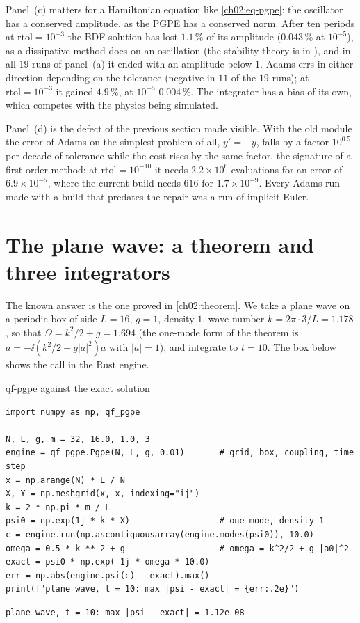 Panel~(c) matters for a Hamiltonian equation like \cref{ch02:eq-pgpe}: the oscillator has a conserved amplitude, as the PGPE has a conserved norm. After ten periods at $\mathrm{rtol}=10^{-3}$ the BDF solution has lost $1.1\,\%$ of its amplitude ($0.043\,\%$ at $10^{-5}$), as a dissipative method does on an oscillation (the stability theory is in
\cite{HairerWanner1996}), and in all $19$ runs of panel~(a) it ended with an amplitude below $1$. Adams errs in either direction depending on the tolerance (negative in $11$ of the $19$ runs); at $\mathrm{rtol}=10^{-3}$ it gained $4.9\,\%$, at $10^{-5}$ $0.004\,\%$. The integrator
has a bias of its own, which competes with the physics being simulated.

Panel~(d) is the defect of the previous section made visible. With the old module the error of Adams on the simplest problem of all, $y'=-y$, falls by a factor $10^{0.5}$ per decade of tolerance while the cost rises by the same
factor, the signature of a first-order method: at $\mathrm{rtol}=10^{-10}$ it needs $2.2\times10^{6}$ evaluations for an error of $6.9\times10^{-5}$, where the current build needs $616$ for $1.7\times10^{-9}$.
Every Adams run made with a build that predates the repair was a run of implicit Euler.

\section{The plane wave: a theorem and three integrators}\label{ch02:planewave}

The known answer is the one proved in \cref{ch02:theorem}. We take a plane wave on a periodic box of side $L=16$, $g=1$, density $1$, wave number $k=2\pi\cdot3/L=1.178$, so that
$\Omega=k^2/2+g=1.694$ (the one-mode form of the theorem is $\dot a=-\ii(k^2/2+g|a|^2)a$ with $|a|=1$), and integrate to $t=10$. The box below shows the call in the Rust engine.

\begin{rustbox}{qf-pgpe against the exact solution}
\begin{lstlisting}[style=py]
import numpy as np, qf_pgpe

N, L, g, m = 32, 16.0, 1.0, 3
engine = qf_pgpe.Pgpe(N, L, g, 0.01)       # grid, box, coupling, time step
x = np.arange(N) * L / N
X, Y = np.meshgrid(x, x, indexing="ij")
k = 2 * np.pi * m / L
psi0 = np.exp(1j * k * X)                  # one mode, density 1
c = engine.run(np.ascontiguousarray(engine.modes(psi0)), 10.0)
omega = 0.5 * k ** 2 + g                   # omega = k^2/2 + g |a0|^2
exact = psi0 * np.exp(-1j * omega * 10.0)
err = np.abs(engine.psi(c) - exact).max()
print(f"plane wave, t = 10: max |psi - exact| = {err:.2e}")
\end{lstlisting}
\begin{lstlisting}[style=plainmono]
plane wave, t = 10: max |psi - exact| = 1.12e-08
\end{lstlisting}
\end{rustbox}

